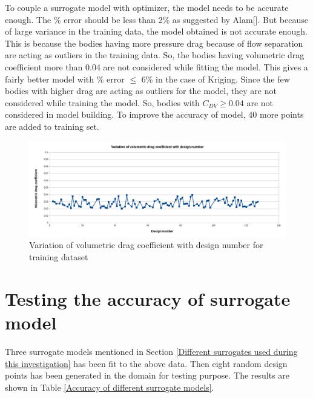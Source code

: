 To couple a surrogate model with optimizer, the model needs to be accurate enough. The \% error should be less than 2\% as suggested by Alam[]. But because of large variance in the training data, the model obtained is not accurate enough. This is because the bodies having more pressure drag because of flow separation are acting as outliers in the training data. So, the bodies having volumetric drag coefficient more than 0.04 are not considered while fitting the model. This gives a fairly better model with \% error $ \le $ 6\% in the case of Kriging.
Since the few bodies with higher drag are acting as outliers for the model, they are not considered while training the model. So, bodies with $ C_{DV} \ge 0.04$ are not considered in model building. To improve the accuracy of model, 40 more points are added to training set.

\begin{figure}[H]
	\centering
	\includegraphics[width=450 pt]{surrogate_model_CFD_results/Volumetric_drag_coeff_training.png}
	\caption{Variation of volumetric drag coefficient with design number for training dataset}
	\label{Volumetric drag coefficient plot training data} %
\end{figure}

\section{Testing the accuracy of surrogate model}

Three surrogate models mentioned in Section \ref{Different surrogates used during this investigation} has been fit to the above data. Then eight random design points has been generated in the domain for testing purpose. The results are shown in Table \ref{Accuracy of different surrogate models}.

